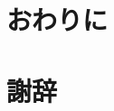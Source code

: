 \documentclass[master]{suribt}
\theoremstyle{definition}
\begin{document}
 \chapter{おわりに}

 \backmatter%
 \chapter{謝辞}%


  \appendix%
  \chapter{}
  
\end{document}
